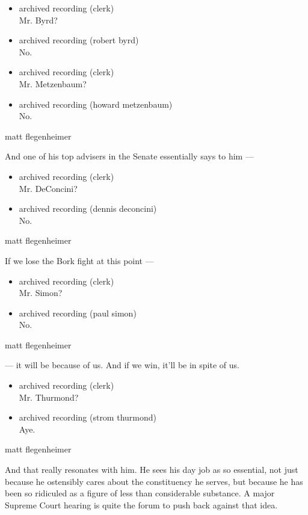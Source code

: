 \begin{itemize}
\item
  archived recording (clerk)\\
  Mr. Byrd?
\item
  archived recording (robert byrd)\\
  No.
\item
  archived recording (clerk)\\
  Mr. Metzenbaum?
\item
  archived recording (howard metzenbaum)\\
  No.
\end{itemize}

matt flegenheimer

And one of his top advisers in the Senate essentially says to him ---

\begin{itemize}
\item
  archived recording (clerk)\\
  Mr. DeConcini?
\item
  archived recording (dennis deconcini)\\
  No.
\end{itemize}

matt flegenheimer

If we lose the Bork fight at this point ---

\begin{itemize}
\item
  archived recording (clerk)\\
  Mr. Simon?
\item
  archived recording (paul simon)\\
  No.
\end{itemize}

matt flegenheimer

--- it will be because of us. And if we win, it'll be in spite of us.

\begin{itemize}
\item
  archived recording (clerk)\\
  Mr. Thurmond?
\item
  archived recording (strom thurmond)\\
  Aye.
\end{itemize}

matt flegenheimer

And that really resonates with him. He sees his day job as so essential,
not just because he ostensibly cares about the constituency he serves,
but because he has been so ridiculed as a figure of less than
considerable substance. A major Supreme Court hearing is quite the forum
to push back against that idea.

